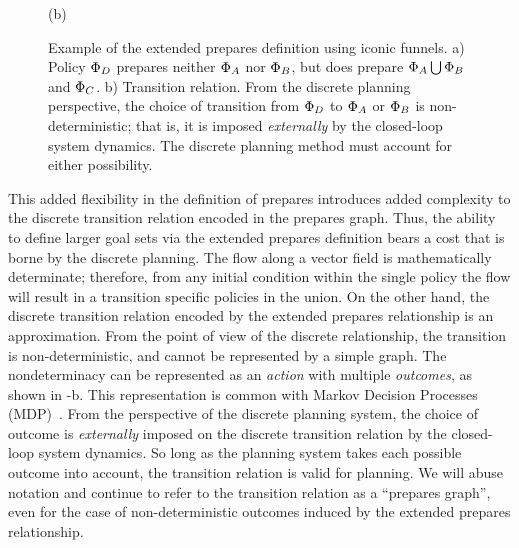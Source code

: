 \begin{figure}[bt]
\begin{minipage}{0.45\linewidth}
{\footnotesize (b)}
\end{minipage}
 
\caption[Extended prepares definition]{Example of the extended
  prepares definition using iconic funnels.  a) Policy $\Phi_D$
  prepares neither $\Phi_A$ nor $\Phi_B$, but does prepare $\Phi_A \operatorname*{\bigcup}
  \Phi_B$ and $\Phi_C$. b) Transition relation.  From the discrete
  planning perspective, the choice of transition from $\Phi_D$ to
  $\Phi_A$ or $\Phi_B$ is non-deterministic; that is, it is imposed
  \emph{externally} by the closed-loop system dynamics.  The discrete
  planning method must account for either possibility.}

  \label{fig:approach_nondeter} 

\end{figure}

This added flexibility in the definition of prepares introduces added complexity to
the discrete transition relation encoded in the prepares graph.  Thus, the ability to
define larger goal sets via the extended prepares definition bears a cost that is
borne by the discrete planning.  The flow along a vector field is mathematically
determinate; therefore, from any initial condition within the single policy the flow
will result in a transition specific policies in the union. On the other hand, the
discrete transition relation encoded by the extended prepares relationship is an
approximation.  From the point of view of the discrete relationship, the transition
is non-deterministic, and cannot be represented by a simple graph.  The
nondeterminacy can be represented as an \emph{action} with multiple \emph{outcomes},
as shown in -b.  This representation is common with Markov
Decision Processes (MDP)~\cite{maxim_03,Wiki:MDP}.  From the perspective of the
discrete planning system, the choice of outcome is \emph{externally} imposed on the
discrete transition relation by the closed-loop system dynamics.
So long as the planning system takes each possible outcome into
account, the transition relation is valid for planning.  We will abuse
notation and continue to refer to the transition relation as a
``prepares graph'', even for the case of non-deterministic outcomes
induced by the extended prepares relationship.



